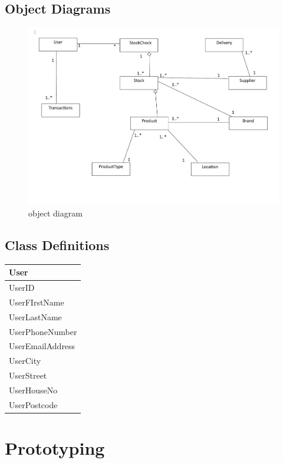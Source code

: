 \subsection{Object Diagrams}

\begin{figure}[H]
    \includegraphics[width=\textwidth]{./Design/pdfimages/object_diagram.pdf}
    \caption{object diagram} \label{fig:object diagram}
\end{figure}

\subsection{Class Definitions}

\begin{center}
\begin{tabular}{|p{3cm}|}
	\hline
	\textbf{User} \\ \hline
	UserID \\
	UserFIrstName \\
	UserLastName \\
	UserPhoneNumber \\
	UserEmailAddress \\
	UserCity \\
	UserStreet \\
	UserHouseNo \\
	UserPostcode \\ \hline
\end{tabular}
\end{center}
	


\section{Prototyping}

